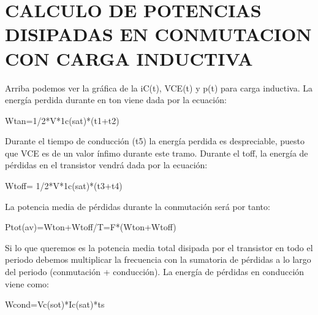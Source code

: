 \documentclass[11pt,a4paper]{article}
\begin{document}
\section{CALCULO DE POTENCIAS DISIPADAS EN CONMUTACION CON CARGA INDUCTIVA}
Arriba podemos ver la gráfica de la iC(t), VCE(t) y p(t) para carga inductiva. La energía perdida durante en ton viene dada por la ecuación:
\begin{center}
Wtan=1/2*V*1c(sat)*(t1+t2)
\end{center}
Durante el tiempo de conducción (t5) la energía perdida es despreciable, puesto que VCE es de un valor ínfimo durante este tramo.
Durante el toff, la energía de pérdidas en el transistor vendrá dada por la ecuación:
\begin{center}
Wtoff= 1/2*V*1c(sat)*(t3+t4)
\end{center}
La potencia media de pérdidas durante la conmutación será por tanto:
\begin{center}
Ptot(av)=Wton+Wtoff/T=F*(Wton+Wtoff)
\end{center}
Si lo que queremos es la potencia media total disipada por el transistor en todo el periodo debemos multiplicar la frecuencia con la sumatoria de pérdidas a lo largo del periodo (conmutación + conducción). La energía de pérdidas en conducción viene como:
\begin{center}
Wcond=Vc(sot)*Ic(sat)*ts
\end{center}
\end{document}
